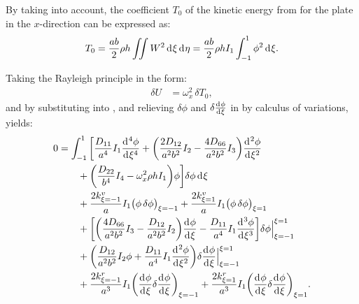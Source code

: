\documentclass[preprint,12pt,number]{elsarticle}
\newcommand{\id}{\mathrm{d}\mkern1mu}
\begin{document}
By taking  into account, the coefficient $T_0$ of the kinetic energy from  for the plate in the $x$-direction can be expressed as:
%
\begin{equation}\label{eq:kine_energyx}
\begin{split}
	T_0 = \frac{ab}{2}\rho h\iint W^2 \, \id \xi \, \id \eta = \frac{ab}{2}\rho h I_1\int_{-1}^{1} \phi^2 \, \id \xi.
\end{split}
\end{equation}

Taking the Rayleigh principle in the form:
%
\begin{equation}\label{eq:Rayleighx}
\begin{split}
	\delta U &= \omega_x^2 \, \delta T_0,
\end{split}
\end{equation}
%
and by substituting  into , and relieving $\delta \phi$ and $\delta\frac{\id  \phi}{\id \xi}$ in  by calculus of variations, yields:
%
\begin{equation}\label{eq:Rayleighx2}
\begin{split}
	0 &= \int_{-1}^{1} \bigg[ \frac{D_{11}}{a^4} I_1 \frac{\id^4 \phi}{\id \xi^4} 
	+ \bigg( \frac{2D_{12}}{a^2b^2} I_2 - \frac{4D_{66}}{a^2b^2} I_3 \bigg) \frac{\id^2 \phi}{\id \xi^2} \\
	&\qquad + \bigg( \frac{D_{22}}{b^4} I_4 - \omega_x^2 \rho h I_1 \bigg) \phi \bigg] \delta \phi \, \id \xi \\
	&\qquad + \frac{2k^v_{\xi=-1}}{a} I_1 \big(\phi\, \delta \phi\big)_{\xi=-1} 
	+ \frac{2k^v_{\xi=1}}{a} I_1 \big(\phi\, \delta \phi\big)_{\xi=1} \\
	&\qquad + \bigg[ \bigg( \frac{4D_{66}}{a^2b^2} I_3 - \frac{D_{12}}{a^2b^2} I_2 \bigg) \frac{\id \phi}{\id \xi} 
	- \frac{D_{11}}{a^4} I_1 \frac{\id^3 \phi}{\id \xi^3} \bigg] \delta \phi \Big|^{\xi=1}_{\xi=-1} \\
	&\qquad + \bigg( \frac{D_{12}}{a^2b^2} I_2 \phi + \frac{D_{11}}{a^4} I_1 \frac{\id^2 \phi}{\id \xi^2} \bigg) 
	\delta\frac{\id  \phi}{\id \xi} \Big|^{\xi=1}_{\xi=-1} \\
	&\qquad + \frac{2k^r_{\xi=-1}}{a^3} I_1 \bigg(\frac{\id \phi}{\id \xi}\delta \frac{\id \phi}{\id \xi}\bigg)_{\xi=-1} 
	+ \frac{2k^r_{\xi=1}}{a^3} I_1 \bigg(\frac{\id \phi}{\id \xi} \delta\frac{\id \phi}{\id \xi}\bigg)_{\xi=1}.
\end{split}
\end{equation}
\end{document}
